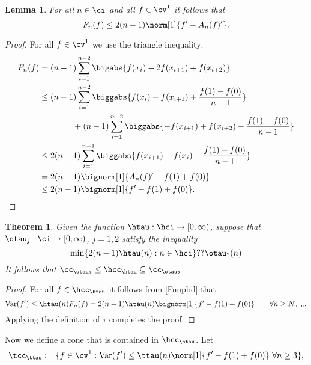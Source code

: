 \documentclass[]{elsarticle}
\DeclareMathOperator{\Var}{Var}
\newtheorem{theorem}{Theorem}
\newtheorem{lem}{Lemma}
\theoremstyle{definition}
\theoremstyle{remark}
\begin{document}
\begin{lem} \label{FnFtnlem}  For all $n \in \ci$ and all $ f \in \cv^1$ it follows that 
\begin{equation}
F_n(f) \le 2(n-1)\norm[1]{f'-A_n(f)'}. \label{Fnupbd}
\end{equation}
\end{lem}
\begin{proof}
For all $f \in \cv^1$ we use the triangle inequality:
\begin{align*} 
\nonumber
F_{n}(f) &= (n-1)\sum_{i=1}^{n-2} \bigabs{f(x_{i}) - 2 f(x_{i+1})+f(x_{i+2})}\\
\nonumber
&\le (n-1)\sum_{i=1}^{n-2} \biggabs{f(x_{i}) - f(x_{i+1})+\frac{f(1)-f(0)}{n-1}}\\
\nonumber
&\qquad \qquad + (n-1)\sum_{i=1}^{n-2} \biggabs{- f(x_{i+1})+f(x_{i+2}) -\frac{f(1)-f(0)}{n-1}}\\
\nonumber
&\le 2 (n-1) \sum_{i=1}^{n-1}\biggabs{f(x_{i+1})-f(x_{i}) - \frac{f(1)-f(0)}{n-1}}\\
\nonumber
&=2(n-1) \bignorm[1]{A_n(f)'-f(1)+f(0)} \\
&\le 2(n-1) \bignorm[1]{f'-f(1)+f(0)} . 
\end{align*}
\end{proof}

\begin{theorem}  Given the function $\htau: \hci \to [0,\infty)$, suppose that $\otau_j : \ci \to [0,\infty)$, $j=1,2$ satisfy the inequality
\begin{equation} \label{inequalbar}
\min\{ 2(n-1) \htau(n) : n \in \hci  \} ?? \otau_?(n) 
\end{equation}
It follows that $\cc_{\otau_1} \le \hcc_{\htau} \subseteq \cc_{\otau_2}$.  
\end{theorem}
\begin{proof}  For all $f \in \hcc_{\htau}$ it follows from \eqref{Fnupbd} that
\begin{equation*}
\Var(f') \le \htau(n) F_n(f) = 2(n-1) \htau(n) \bignorm[1]{f'-f(1)+f(0)} \qquad \forall n \ge N_{\min}. 
\end{equation*}
Applying the definition of $\tau$ completes the proof.
\end{proof}

Now we define a cone that is contained in $\hcc_{\htau}$.  Let 
\begin{equation}\label{smallconeinteg}
\tcc_{\ttau}:=\{f\in \cv^{1}:\Var(f')\leq\ttau(n)\norm[1]{f'-f(1)+f(0)} \ \forall n\ge 3  \},
\end{equation}
\end{document}
